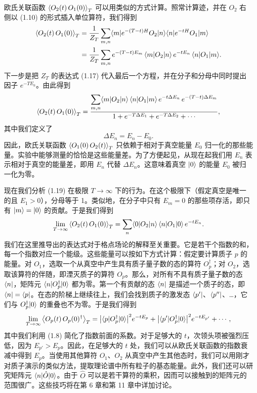 欧氏关联函数 $\left\langle O_2(t)\,O_1(0) \right\rangle_T$ 可以用类似的方式计算。照常计算迹，并在 $O_2$ 右侧以 (1.10) 的形式插入单位算符，我们得到
\begin{align}
  \left\langle O_2(t)\,O_1(0) \right\rangle_T
  &= \frac{1}{Z_T}\sum_{m,n}\langle m|e^{-(T-t)H}O_2|n\rangle\langle n|e^{-tH}O_1|m\rangle \notag\\
  &= \frac{1}{Z_T}\sum_{m,n} e^{-(T-t)E_m}\,\langle m|O_2|n\rangle\,e^{-tE_n}\,\langle n|O_1|m\rangle.
\end{align}
下一步是把 $Z_T$ 的表达式 (1.17) 代入最后一个方程，并在分子和分母中同时提出因子 $e^{-TE_0}$。由此得到
\begin{equation}
  \left\langle O_2(t)\,O_1(0) \right\rangle_T
  = \frac{\displaystyle\sum_{m,n}\langle m|O_2|n\rangle\,\langle n|O_1|m\rangle\,
       e^{-t\Delta E_n}\,e^{-(T-t)\Delta E_m}}
         {1 + e^{-T\Delta E_1} + e^{-T\Delta E_2} + \cdots},
\end{equation}
其中我们定义了
\begin{equation}
  \Delta E_n = E_n - E_0.
\end{equation}
因此，欧氏关联函数 $\left\langle O_1(0)\,O_2(t) \right\rangle_T$ 只依赖于相对于真空能量 $E_0$ 归一化的那些能量。实验中能够测量的恰恰是这些能量差。为了方便起见，从现在起我们用 $E_n$ 表示相对于真空的能量差，即用 $E_n$ 代替 $\Delta E_n$。这意味着真空 $|0\rangle$ 的能量 $E_0$ 被归一化为零。

现在我们分析 (1.19) 在极限 $T \to \infty$ 下的行为。在这个极限下（假定真空是唯一的且 $E_1 > 0$），分母等于 1。类似地，在分子中只有 $E_m = 0$ 的那些项存活，即只有 $|m\rangle = |0\rangle$ 的贡献。于是我们得到
\begin{equation}
  \lim_{T\to\infty}\left\langle O_2(t)\,O_1(0) \right\rangle_T
  = \sum_n \langle0|O_2|n\rangle\,\langle n|O_1|0\rangle\,e^{-tE_n}.
\end{equation}
我们在这里推导出的表达式对于格点场论的解释至关重要。它是若干个指数的和，每一个指数对应一个能级。这些能量可以按如下方式计算：假定要计算质子 $p$ 的能量。对 $O_1$，选取一个从真空中产生具有质子量子数的态的算符 $O_p^\dagger$；对 $O_2$，选取该算符的伴随，即湮灭质子的算符 $O_p$。那么，对所有不具有质子量子数的态 $\langle n|$，矩阵元 $\langle n|O_p^\dagger|0\rangle$ 都为零。第一个有贡献的态 $\langle n|$ 是描述一个质子的态，即 $\langle n| = \langle p|$。在态的阶梯上继续往上，我们会找到质子的激发态 $\langle p'|$、$\langle p''|$、\dots，它们与 $O_p^\dagger|0\rangle$ 的重叠也不为零。于是我们得到
\begin{equation}
  \lim_{T\to\infty}\left\langle O_p(t)\,O_p(0)^\dagger \right\rangle_T
  = \big|\langle p|O_p^\dagger|0\rangle\big|^2 e^{-tE_p}
    + \big|\langle p'|O_p^\dagger|0\rangle\big|^2 e^{-tE_{p'}} + \cdots,
\end{equation}
其中我们利用 (1.8) 简化了指数前面的系数。对于足够大的 $t$，次领头项被强烈压低，因为 $E_{p'} > E_p$。因此，在足够大的 $t$ 处，我们可以从欧氏关联函数的指数衰减中得到 $E_p$。当使用其他算符 $O_1$、$O_2$ 从真空中产生其他态时，我们可以用刚才对质子演示的类似方法，提取理论谱中所有粒子的基态能量。此外，我们还可以研究矩阵元 $\langle n|\hat{O}|0\rangle$。由于 $\hat{O}$ 可以是若干算符的乘积，因而可以接触到的矩阵元的范围很广。这些技巧将在第 6 章和第 11 章中详加讨论。

